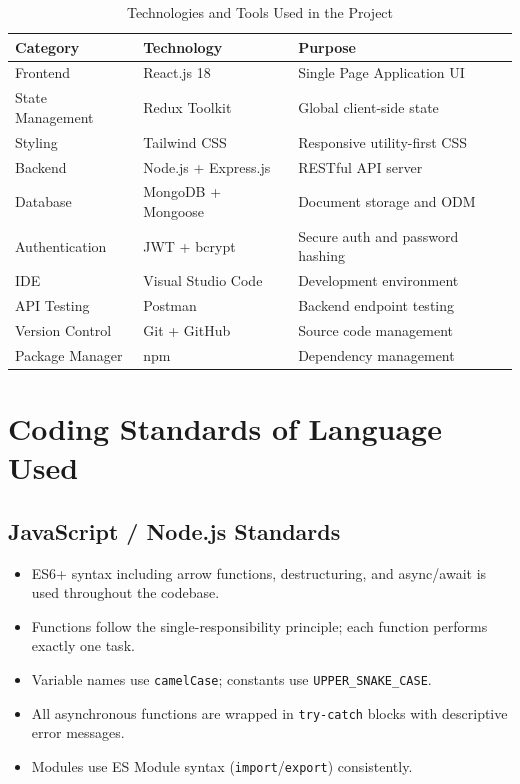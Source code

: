 \documentclass[12pt, a4paper, oneside]{report}
\begin{document}
\FloatBarrier
\begin{table}[H]
\centering
\caption{Technologies and Tools Used in the Project}
\label{tab:tech}
\renewcommand{\arraystretch}{1.3}
\begin{tabular}{|p{3.2cm}|p{3.5cm}|p{5.8cm}|}
\hline
\textbf{Category}      & \textbf{Technology}          & \textbf{Purpose} \\
\hline
Frontend               & React.js 18                  & Single Page Application UI \\
\hline
State Management       & Redux Toolkit                & Global client-side state \\
\hline
Styling                & Tailwind CSS                 & Responsive utility-first CSS \\
\hline
Backend                & Node.js + Express.js         & RESTful API server \\
\hline
Database               & MongoDB + Mongoose           & Document storage and ODM \\
\hline
Authentication         & JWT + bcrypt                 & Secure auth and password hashing \\
\hline
IDE                    & Visual Studio Code           & Development environment \\
\hline
API Testing            & Postman                      & Backend endpoint testing \\
\hline
Version Control        & Git + GitHub                 & Source code management \\
\hline
Package Manager        & npm                          & Dependency management \\
\hline
\end{tabular}
\end{table}
\FloatBarrier

\section{Coding Standards of Language Used}

\subsection{JavaScript / Node.js Standards}

\begin{itemize}[leftmargin=1.5cm, itemsep=2pt]
  \item ES6+ syntax including arrow functions, destructuring, and async/await is used throughout the codebase.
  \item Functions follow the single-responsibility principle; each function performs exactly one task.
  \item Variable names use \texttt{camelCase}; constants use \texttt{UPPER\_SNAKE\_CASE}.
  \item All asynchronous functions are wrapped in \texttt{try-catch} blocks with descriptive error messages.
  \item Modules use ES Module syntax (\texttt{import}/\texttt{export}) consistently.
\end{itemize}
\end{document}
